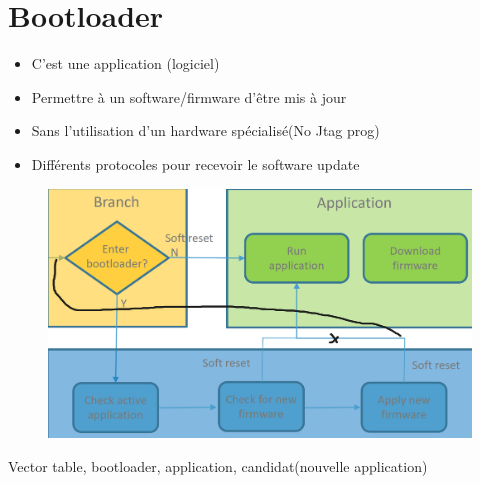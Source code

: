 \documentclass[resume]{subfiles}
\begin{document}
\section{Bootloader}

\begin{itemize}
\item C'est une application (logiciel)
\item Permettre à un software/firmware d'être mis à jour
\item Sans l'utilisation d'un hardware spécialisé(No Jtag prog)
\item Différents protocoles pour recevoir le software update
\end{itemize}

\begin{figure}[H]
    \centering
    \includegraphics[width=0.6\columnwidth]{Figures/bootloader/schemaBloc.png}
\end{figure}
Vector table, bootloader, application, candidat(nouvelle application)
\end{document}
